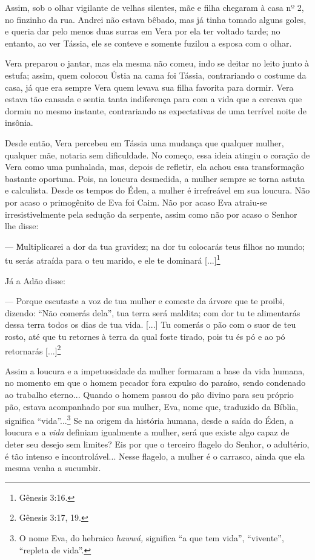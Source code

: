 Assim, sob o olhar vigilante de velhas silentes, mãe e filha chegaram à
casa nº 2, no finzinho da rua. Andrei não estava bêbado, mas já tinha
tomado alguns goles, e queria dar pelo menos duas surras em Vera por ela
ter voltado tarde; no entanto, ao ver Tássia, ele se conteve e somente
fuzilou a esposa com o olhar.

Vera preparou o jantar, mas ela mesma não comeu, indo se deitar no leito
junto à estufa; assim, quem colocou Ústia na cama foi Tássia,
contrariando o costume da casa, já que era sempre Vera quem levava sua
filha favorita para dormir. Vera estava tão cansada e sentia tanta
indiferença para com a vida que a cercava que dormiu no mesmo instante,
contrariando as expectativas de uma terrível noite de insônia.

Desde então, Vera percebeu em Tássia uma mudança que qualquer mulher,
qualquer mãe, notaria sem dificuldade. No começo, essa ideia atingiu o
coração de Vera como uma punhalada, mas, depois de refletir, ela achou
essa transformação bastante oportuna. Pois, na loucura desmedida, a
mulher sempre se torna astuta e calculista. Desde os tempos do Éden, a
mulher é irrefreável em sua loucura. Não por acaso o primogênito de Eva
foi Caim. Não por acaso Eva atraiu-se irresistivelmente pela sedução da
serpente, assim como não por acaso o Senhor lhe disse:

--- Мultiplicarei a dor da tua gravidez; na dor tu colocarás teus filhos
no mundo; tu serás atraída para o teu marido, e ele te dominará
{[}...{]}\footnote{Gênesis 3:16.}

Já a Adão disse:

--- Porque escutaste a voz de tua mulher e comeste da árvore que te
proibi, dizendo: ``Não comerás dela'', tua terra será maldita; com dor
tu te alimentarás dessa terra todos os dias de tua vida. {[}...{]} Tu
comerás o pão com o suor de teu rosto, até que tu retornes à terra da
qual foste tirado, pois tu és pó e ao pó retornarás {[}...{]}\footnote{Gênesis
  3:17, 19.}

Assim a loucura e a impetuosidade da mulher formaram a base da vida
humana, no momento em que o homem pecador fora expulso do paraíso, sendo
condenado ao trabalho eterno... Quando o homem passou do pão divino para
seu próprio pão, estava acompanhado por sua mulher, Eva, nome que,
traduzido da Bíblia, significa ``vida''...\footnote{O nome Eva, do
  hebraico \emph{hawwá,} significa ``a que tem vida'', ``vivente'',
  ``repleta de vida''.} Se na origem da história humana, desde a saída
do Éden, a loucura e a \emph{vida} definiam igualmente a mulher, será
que existe algo capaz de deter seu desejo sem limites? Eis por que o
terceiro flagelo do Senhor, o adultério, é tão intenso e
incontrolável... Nesse flagelo, a mulher é o carrasco, ainda que ela
mesma venha a sucumbir.

